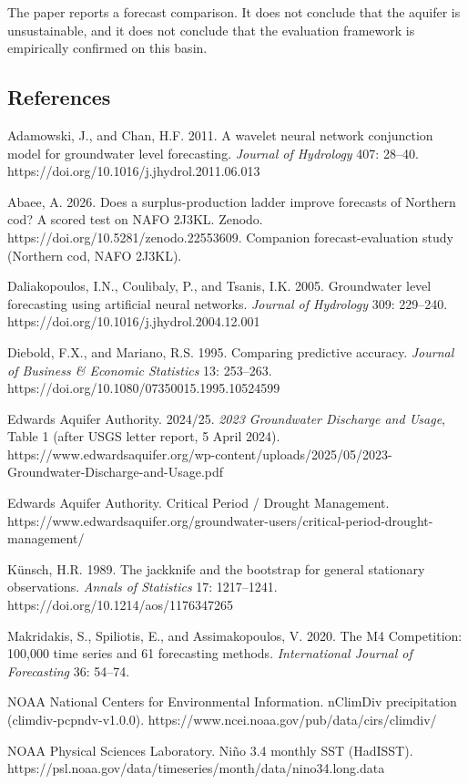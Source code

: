 \documentclass[11pt]{article}
\begin{document}
The paper reports a forecast comparison. It does not conclude that the
aquifer is unsustainable, and it does not conclude that the evaluation
framework is empirically confirmed on this basin.

\subsection{References}\label{references}

Adamowski, J., and Chan, H.F. 2011. A wavelet neural network conjunction
model for groundwater level forecasting. \emph{Journal of Hydrology}
407: 28--40. https://doi.org/10.1016/j.jhydrol.2011.06.013

Abaee, A. 2026. Does a surplus-production ladder improve forecasts of
Northern cod? A scored test on NAFO 2J3KL. Zenodo.
https://doi.org/10.5281/zenodo.22553609. Companion forecast-evaluation
study (Northern cod, NAFO 2J3KL).

Daliakopoulos, I.N., Coulibaly, P., and Tsanis, I.K. 2005. Groundwater
level forecasting using artificial neural networks. \emph{Journal of
Hydrology} 309: 229--240. https://doi.org/10.1016/j.jhydrol.2004.12.001

Diebold, F.X., and Mariano, R.S. 1995. Comparing predictive accuracy.
\emph{Journal of Business \& Economic Statistics} 13: 253--263.
https://doi.org/10.1080/07350015.1995.10524599

Edwards Aquifer Authority. 2024/25. \emph{2023 Groundwater Discharge and
Usage}, Table 1 (after USGS letter report, 5 April 2024).
https://www.edwardsaquifer.org/wp-content/uploads/2025/05/2023-Groundwater-Discharge-and-Usage.pdf

Edwards Aquifer Authority. Critical Period / Drought Management.
https://www.edwardsaquifer.org/groundwater-users/critical-period-drought-management/

K\"unsch, H.R. 1989. The jackknife and the bootstrap for general
stationary observations. \emph{Annals of Statistics} 17: 1217--1241.
https://doi.org/10.1214/aos/1176347265

Makridakis, S., Spiliotis, E., and Assimakopoulos, V. 2020. The M4
Competition: 100,000 time series and 61 forecasting methods.
\emph{International Journal of Forecasting} 36: 54--74.

NOAA National Centers for Environmental Information. nClimDiv
precipitation (climdiv-pcpndv-v1.0.0).
https://www.ncei.noaa.gov/pub/data/cirs/climdiv/

NOAA Physical Sciences Laboratory. Ni\~no 3.4 monthly SST (HadISST).
https://psl.noaa.gov/data/timeseries/month/data/nino34.long.data
\end{document}
